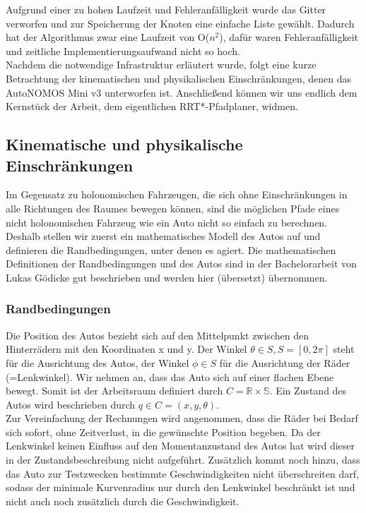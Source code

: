 Aufgrund einer zu hohen Laufzeit und Fehleranfälligkeit wurde das Gitter verworfen und zur Speicherung der Knoten eine einfache Liste gewählt. Dadurch hat der Algorithmus zwar eine Laufzeit von O($n^2$), dafür waren Fehleranfälligkeit und zeitliche Implementierungsaufwand nicht so hoch. \\

Nachdem die notwendige Infrastruktur erläutert wurde, folgt eine kurze Betrachtung der kinematischen und physikalischen Einschränkungen, denen das AutoNOMOS Mini v3 unterworfen ist. Anschließend können wir uns endlich dem Kernstück der Arbeit, dem eigentlichen RRT*-Pfadplaner, widmen.
\subsection{Kinematische und physikalische Einschränkungen}
Im Gegensatz zu holonomischen Fahrzeugen, die sich ohne Einschränkungen in alle Richtungen des Raumes bewegen können, sind die möglichen Pfade eines nicht holonomischen Fahrzeug wie ein Auto nicht so einfach zu berechnen. Deshalb stellen wir zuerst ein mathematisches Modell des Autos auf und definieren die Randbedingungen, unter denen es agiert.
Die mathematischen Definitionen der Randbedingungen und des Autos sind in der Bachelorarbeit von Lukas Gödicke \citep{Goedicke18} gut beschrieben und werden hier (übersetzt) übernommen. \\
\subsubsection{Randbedingungen}
Die Position des Autos bezieht sich auf den Mittelpunkt zwischen den Hinterrädern mit den Koordinaten x und y. Der Winkel $\theta \in S,  S=[0,2\pi]$ steht für die Ausrichtung des Autos, der Winkel $\phi \in S$ für die Ausrichtung der Räder (=Lenkwinkel). Wir nehmen an, dass das Auto sich auf einer flachen Ebene bewegt. Somit ist der Arbeitsraum definiert durch $C =  \mathbb{R \times S}$. Ein Zustand des Autos wird beschrieben durch $q \in C = (x,y,\theta)$.\\
Zur Vereinfachung der Rechnungen wird angenommen, dass die Räder bei Bedarf sich sofort, ohne Zeitverlust, in die gewünschte Position begeben. Da der Lenkwinkel keinen Einfluss auf den Momentanzustand des Autos hat wird dieser in der Zustandsbeschreibung nicht aufgeführt. Zusätzlich kommt noch hinzu, dass das Auto zur Testzwecken bestimmte Geschwindigkeiten nicht überschreiten darf, sodass der minimale Kurvenradius nur durch den Lenkwinkel beschränkt ist und nicht auch noch zusätzlich durch die Geschwindigkeit. \\

